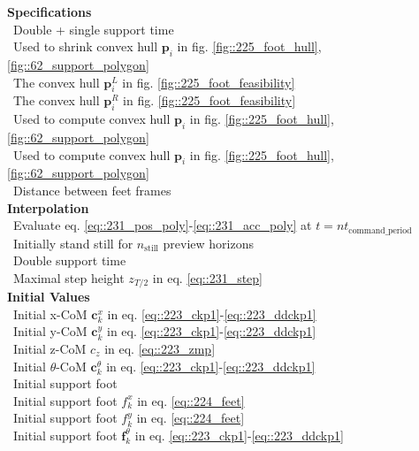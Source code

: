\begin{minipage}[t]{1.\textwidth}
	\begin{minipage}{0.5\textwidth}
		\scriptsize{
			\hfill \textbf{Specifications}\\
			\mbox{}~\hfill Double + single support time\\
			\mbox{}~\hfill Used to shrink convex hull $\bm{p}_i$ in fig.  \ref{fig::225_foot_hull}, \ref{fig::62_support_polygon}\\
			\mbox{}~\hfill The convex hull $\bm{p}^L_i$ in fig. \ref{fig::225_foot_feasibility}\\
			\mbox{}~\hfill The convex hull $\bm{p}^R_i$ in fig. \ref{fig::225_foot_feasibility}\\
			\mbox{}~\hfill Used to compute convex hull $\bm{p}_i$ in fig.  \ref{fig::225_foot_hull}, \ref{fig::62_support_polygon}\\
			\mbox{}~\hfill Used to compute convex hull $\bm{p}_i$ in fig.  \ref{fig::225_foot_hull}, \ref{fig::62_support_polygon}\\
			\mbox{}~\hfill Distance between feet frames\\
			
			\hfill \textbf{Interpolation}\\
			\mbox{}~\hfill Evaluate eq. \ref{eq::231_pos_poly}-\ref{eq::231_acc_poly} at $t=nt_\text{command\_period}$\\
			\mbox{}~\hfill Initially stand still for $n_\text{still}$ preview horizons\\
			\mbox{}~\hfill Double support time\\
			\mbox{}~\hfill Maximal step height $z_{T/2}$ in eq. \ref{eq::231_step}\\
			
			\hfill \textbf{Initial Values}\\
			\mbox{}~\hfill Initial x-CoM $\bm{c}_k^x$ in eq. \ref{eq::223_ckp1}-\ref{eq::223_ddckp1}\\
			\mbox{}~\hfill Initial y-CoM $\bm{c}_k^y$ in eq. \ref{eq::223_ckp1}-\ref{eq::223_ddckp1}\\
			\mbox{}~\hfill Initial z-CoM $c_z$ in eq. \ref{eq::223_zmp}\\
			\mbox{}~\hfill Initial $\theta$-CoM $\bm{c}_k^\theta$ in eq. \ref{eq::223_ckp1}-\ref{eq::223_ddckp1}\\
			\mbox{}~\hfill Initial support foot\\
			\mbox{}~\hfill Initial support foot $f_k^x$ in eq. \ref{eq::224_feet}\\
			\mbox{}~\hfill Initial support foot $f_k^y$ in eq. \ref{eq::224_feet}\\
			\mbox{}~\hfill Initial support foot $\bm{f}_k^\theta$ in eq. \ref{eq::223_ckp1}-\ref{eq::223_ddckp1}\\
			
}
\end{minipage}
\end{minipage}
